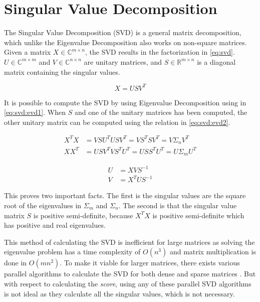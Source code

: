 \section{Singular Value Decomposition}

The Singular Value Decomposition (SVD) is a general matrix decomposition, which unlike the Eigenvalue Decomposition also works on non-square matrices. Given a matrix $X \in \mathbb{C}^{m \times n}$, the SVD results in the factorization in \eqref{eq:svd}. $U \in \mathbb{C}^{m \times m}$ and $V \in \mathbb{C}^{n \times n}$ are unitary matrices, and $S \in \mathbb{R}^{m \times n}$ is a diagonal matrix containing the singular values.

\begin{equation} \label{eq:svd}
    X = USV^T
\end{equation}

It is possible to compute the SVD by using Eigenvalue Decomposition using in \eqref{eq:svd:evd1}. When $S$ and one of the unitary matrices has been computed, the other unitary matrix can be computed using the relation in \eqref{eq:svd:evd2}.
 
\begin{equation} \label{eq:svd:evd1}
\begin{split} 
    X^T X &= VSU^T USV^T = VS^T SV^T = V \Sigma_n V^T \\
    X X^T &= USV^T VS^TU^T = US S^TU^T = U \Sigma_m U^T
\end{split}
\end{equation}

\begin{equation} \label{eq:svd:evd2}
\begin{split} 
    U &= X V S^{-1} \\
    V &= X^T U S^{-1}
\end{split}
\end{equation}

This proves two important facts. The first is the singular values are the square root of the eigenvalues in $\Sigma_m$ and $\Sigma_n$. The second is that the singular value matrix $S$ is positive semi-definite, because $X^T X$ is positive semi-definite which has positive and real eigenvalues.

This method of calculating the SVD is inefficient for large matrices as solving the eigenvalue problem has a time complexity of $O(n^3)$ and matrix multiplication is done in $O(mn^2)$. To make it viable for larger matrices, there exists various parallel algorithms to calculate the SVD for both dense and sparse matrices \cite[Chapter~4]{erricos:handbook}. But with respect to calculating the \textit{score}, using any of these parallel SVD algorithms is not ideal as they calculate all the singular values, which is not necessary.

